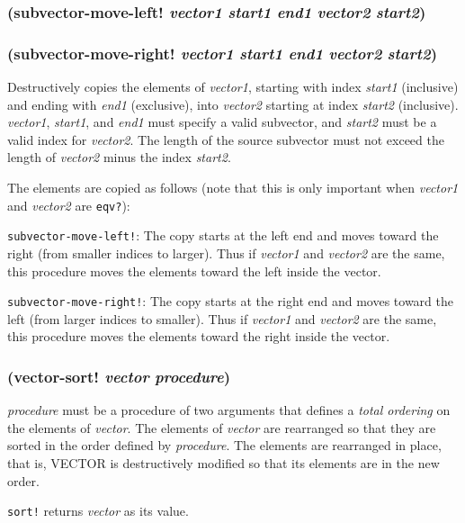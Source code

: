 \documentclass{article}
\begin{document}
\subsubsection{(subvector-move-left! \emph{vector1} \emph{start1} \emph{end1} \emph{vector2} \emph{start2})}

\subsubsection{(subvector-move-right! \emph{vector1} \emph{start1} \emph{end1} \emph{vector2} \emph{start2})}

Destructively copies the elements of \emph{vector1}, starting with index \emph{start1}
(inclusive) and ending with \emph{end1} (exclusive), into \emph{vector2} starting at index
\emph{start2} (inclusive). \emph{vector1}, \emph{start1}, and \emph{end1} must specify a valid
subvector, and \emph{start2} must be a valid index for \emph{vector2}. The length of the
source subvector must not exceed the length of \emph{vector2} minus the index \emph{start2}.

The elements are copied as follows (note that this is only important when \emph{vector1} and
\emph{vector2} are \verb|eqv?|):

\verb|subvector-move-left!|: The copy starts at the left end and moves toward the right
(from smaller indices to larger). Thus if \emph{vector1} and \emph{vector2} are the same, this
procedure moves the elements toward the left inside the vector.

\verb|subvector-move-right!|: The copy starts at the right end and moves toward the left
(from larger indices to smaller). Thus if \emph{vector1} and \emph{vector2} are the same, this
procedure moves the elements toward the right inside the vector.

\subsubsection{(vector-sort! \emph{vector} \emph{procedure})}

\emph{procedure} must be a procedure of two arguments that defines a \emph{total ordering} on
the elements of \emph{vector}. The elements of \emph{vector} are rearranged so that they are
sorted in the order defined by \emph{procedure}. The elements are rearranged in place, that
is, VECTOR is destructively modified so that its elements are in the new order.

\verb|sort!| returns \emph{vector} as its value.
\end{document}
